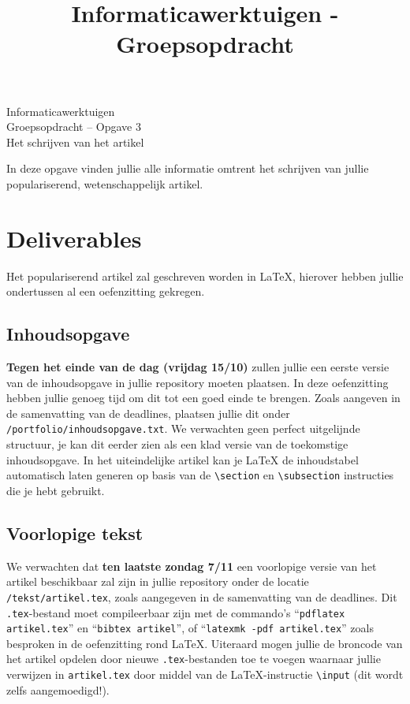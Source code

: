 \documentclass[a4paper]{article}
\title{Informaticawerktuigen - Groepsopdracht}
\begin{document}
\begin{center}
  \huge Informaticawerktuigen \\
  \Huge Groepsopdracht -- Opgave 3 \\
  \huge Het schrijven van het artikel
\end{center}
\vspace{1em}

In deze opgave vinden jullie alle informatie omtrent het schrijven van jullie populariserend, wetenschappelijk artikel.


\section{Deliverables}

Het populariserend artikel zal geschreven worden in \LaTeX{}, hierover hebben jullie ondertussen al een oefenzitting gekregen.

\subsection{Inhoudsopgave}

\textbf{Tegen het einde van de dag (vrijdag 15/10)} zullen jullie een eerste versie van de inhoudsopgave in jullie repository moeten plaatsen.
In deze oefenzitting hebben jullie genoeg tijd om dit tot een goed einde te brengen.
Zoals aangeven in de samenvatting van de deadlines, plaatsen jullie dit onder \texttt{/portfolio/inhoudsopgave.txt}.
We verwachten geen perfect uitgelijnde structuur, je kan dit eerder zien als een klad versie van de toekomstige inhoudsopgave.
In het uiteindelijke artikel kan je \LaTeX{} de inhoudstabel automatisch laten generen op basis van de \texttt{\textbackslash section} en \texttt{\textbackslash subsection} instructies die je hebt gebruikt.


\subsection{Voorlopige tekst}

We verwachten dat \textbf{ten laatste zondag 7/11} een voorlopige versie van het artikel beschikbaar zal zijn in jullie repository onder de locatie \texttt{/tekst/artikel.tex}, zoals aangegeven in de samenvatting van de deadlines.
Dit \texttt{.tex}-bestand moet compileerbaar zijn met de commando's ``\texttt{pdflatex artikel.tex}'' en ``\texttt{bibtex artikel}'', of ``\texttt{latexmk -pdf artikel.tex}'' zoals besproken in de oefenzitting rond \LaTeX{}.
Uiteraard mogen jullie de broncode van het artikel opdelen door nieuwe \texttt{.tex}-bestanden toe te voegen waarnaar jullie verwijzen in \texttt{artikel.tex} door middel van de \LaTeX{}-instructie \texttt{\textbackslash input} (dit wordt zelfs aangemoedigd!).
\end{document}
